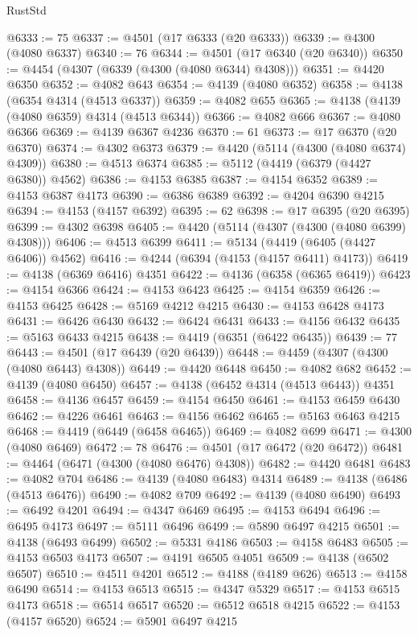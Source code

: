 \begin{lexlean}{RustStd}
\begin{coremodule}
@6333 := 75
@6337 := @4501 (@17 @6333 (@20 @6333))
@6339 := @4300 (@4080 @6337)
@6340 := 76
@6344 := @4501 (@17 @6340 (@20 @6340))
@6350 := @4454 (@4307 (@6339 (@4300 (@4080 @6344) @4308)))
@6351 := @4420 @6350
@6352 := @4082 @643
@6354 := @4139 (@4080 @6352)
@6358 := @4138 (@6354 @4314 (@4513 @6337))
@6359 := @4082 @655
@6365 := @4138 (@4139 (@4080 @6359) @4314 (@4513 @6344))
@6366 := @4082 @666
@6367 := @4080 @6366
@6369 := @4139 @6367 @4236
@6370 := 61
@6373 := @17 @6370 (@20 @6370)
@6374 := @4302 @6373
@6379 := @4420 (@5114 (@4300 (@4080 @6374) @4309))
@6380 := @4513 @6374
@6385 := @5112 (@4419 (@6379 (@4427 @6380)) @4562)
@6386 := @4153 @6385
@6387 := @4154 @6352
@6389 := @4153 @6387 @4173
@6390 := @6386 @6389
@6392 := @4204 @6390 @4215
@6394 := @4153 (@4157 @6392)
@6395 := 62
@6398 := @17 @6395 (@20 @6395)
@6399 := @4302 @6398
@6405 := @4420 (@5114 (@4307 (@4300 (@4080 @6399) @4308)))
@6406 := @4513 @6399
@6411 := @5134 (@4419 (@6405 (@4427 @6406)) @4562)
@6416 := @4244 (@6394 (@4153 (@4157 @6411) @4173))
@6419 := @4138 (@6369 @6416) @4351
@6422 := @4136 (@6358 (@6365 @6419))
@6423 := @4154 @6366
@6424 := @4153 @6423
@6425 := @4154 @6359
@6426 := @4153 @6425
@6428 := @5169 @4212 @4215
@6430 := @4153 @6428 @4173
@6431 := @6426 @6430
@6432 := @6424 @6431
@6433 := @4156 @6432
@6435 := @5163 @6433 @4215
@6438 := @4419 (@6351 (@6422 @6435))
@6439 := 77
@6443 := @4501 (@17 @6439 (@20 @6439))
@6448 := @4459 (@4307 (@4300 (@4080 @6443) @4308))
@6449 := @4420 @6448
@6450 := @4082 @682
@6452 := @4139 (@4080 @6450)
@6457 := @4138 (@6452 @4314 (@4513 @6443)) @4351
@6458 := @4136 @6457
@6459 := @4154 @6450
@6461 := @4153 @6459 @6430
@6462 := @4226 @6461
@6463 := @4156 @6462
@6465 := @5163 @6463 @4215
@6468 := @4419 (@6449 (@6458 @6465))
@6469 := @4082 @699
@6471 := @4300 (@4080 @6469)
@6472 := 78
@6476 := @4501 (@17 @6472 (@20 @6472))
@6481 := @4464 (@6471 (@4300 (@4080 @6476) @4308))
@6482 := @4420 @6481
@6483 := @4082 @704
@6486 := @4139 (@4080 @6483) @4314
@6489 := @4138 (@6486 (@4513 @6476))
@6490 := @4082 @709
@6492 := @4139 (@4080 @6490)
@6493 := @6492 @4201
@6494 := @4347 @6469
@6495 := @4153 @6494
@6496 := @6495 @4173
@6497 := @5111 @6496
@6499 := @5890 @6497 @4215
@6501 := @4138 (@6493 @6499)
@6502 := @5331 @4186
@6503 := @4158 @6483
@6505 := @4153 @6503 @4173
@6507 := @4191 @6505 @4051
@6509 := @4138 (@6502 @6507)
@6510 := @4511 @4201
@6512 := @4188 (@4189 @626)
@6513 := @4158 @6490
@6514 := @4153 @6513
@6515 := @4347 @5329
@6517 := @4153 @6515 @4173
@6518 := @6514 @6517
@6520 := @6512 @6518 @4215
@6522 := @4153 (@4157 @6520)
@6524 := @5901 @6497 @4215

\end{coremodule}
\end{lexlean}
